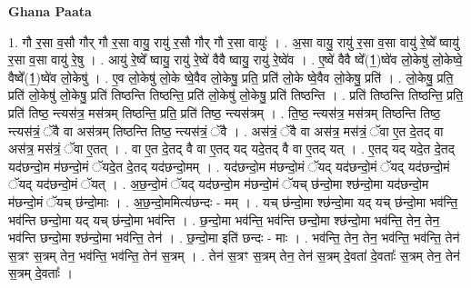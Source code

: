 \documentclass[17pt]{extarticle}
\begin{document}
\textbf{Ghana Paata } \newline

1. गौ र॒सा व॒सौ गौर् गौ र॒सा वायु॒ रायु॑ र॒सौ गौर् गौ र॒सा वायुः॑ । . अ॒सा वायु॒ रायु॑ र॒सा व॒सा वायु॑ रे॒ष्वे᳚ ष्वायु॑ र॒सा व॒सा वायु॑ रे॒षु । . आयु॑ रे॒ष्वे᳚ ष्वायु॒ रायु॑ रे॒ष्वे॑ वैवै ष्वायु॒ रायु॑ रे॒ष्वे॑व । . ए॒ष्वे॑ वैवै ष्वे᳚(1॒)ष्वे॑व लो॒केषु॑ लो॒केष्वे॒ वैष्वे᳚(1॒)ष्वे॑व लो॒केषु॑ । . ए॒व लो॒केषु॑ लो॒के ष्वे॒वैव लो॒केषु॒ प्रति॒ प्रति॑ लो॒के ष्वे॒वैव लो॒केषु॒ प्रति॑ । . लो॒केषु॒ प्रति॒ प्रति॑ लो॒केषु॑ लो॒केषु॒ प्रति॑ तिष्ठन्ति तिष्ठन्ति॒ प्रति॑ लो॒केषु॑ लो॒केषु॒ प्रति॑ तिष्ठन्ति । . प्रति॑ तिष्ठन्ति तिष्ठन्ति॒ प्रति॒ प्रति॑ तिष्ठ॒ न्त्यस॑त्र॒ मस॑त्रम् तिष्ठन्ति॒ प्रति॒ प्रति॑ तिष्ठ॒ न्त्यस॑त्रम् । . ति॒ष्ठ॒ न्त्यस॑त्र॒ मस॑त्रम् तिष्ठन्ति तिष्ठ॒ न्त्यस॑त्रं॒ ॅवै वा अस॑त्रम् तिष्ठन्ति तिष्ठ॒ न्त्यस॑त्रं॒ ॅवै । . अस॑त्रं॒ ॅवै वा अस॑त्र॒ मस॑त्रं॒ ॅवा ए॒त दे॒तद् वा अस॑त्र॒ मस॑त्रं॒ ॅवा ए॒तत् । . वा ए॒त दे॒तद् वै वा ए॒तद् यद् यदे॒तद् वै वा ए॒तद् यत् । . ए॒तद् यद् यदे॒त दे॒तद् यद॑छन्दो॒म म॑छन्दो॒मं ॅयदे॒त दे॒तद् यद॑छन्दो॒मम् । . यद॑छन्दो॒म म॑छन्दो॒मं ॅयद् यद॑छन्दो॒मं ॅयद् यद॑छन्दो॒मं ॅयद् यद॑छन्दो॒मं ॅयत् । . अ॒छ॒न्दो॒मं ॅयद् यद॑छन्दो॒म म॑छन्दो॒मं ॅयच् छ॑न्दो॒मा श्छ॑न्दो॒मा यद॑छन्दो॒म म॑छन्दो॒मं ॅयच् छ॑न्दो॒माः । . अ॒छ॒न्दो॒ममित्य॑छन्दः - मम् । . यच् छ॑न्दो॒मा श्छ॑न्दो॒मा यद् यच् छ॑न्दो॒मा भव॑न्ति॒ भव॑न्ति छन्दो॒मा यद् यच् छ॑न्दो॒मा भव॑न्ति । . छ॒न्दो॒मा भव॑न्ति॒ भव॑न्ति छन्दो॒मा श्छ॑न्दो॒मा भव॑न्ति॒ तेन॒ तेन॒ भव॑न्ति छन्दो॒मा श्छ॑न्दो॒मा भव॑न्ति॒ तेन॑ । . छ॒न्दो॒मा इति॑ छन्दः - माः । . भव॑न्ति॒ तेन॒ तेन॒ भव॑न्ति॒ भव॑न्ति॒ तेन॑ स॒त्रꣳ स॒त्रम् तेन॒ भव॑न्ति॒ भव॑न्ति॒ तेन॑ स॒त्रम् । . तेन॑ स॒त्रꣳ स॒त्रम् तेन॒ तेन॑ स॒त्रम् दे॒वता॑ दे॒वताः᳚ स॒त्रम् तेन॒ तेन॑ स॒त्रम् दे॒वताः᳚ । \newline
\end{document}
